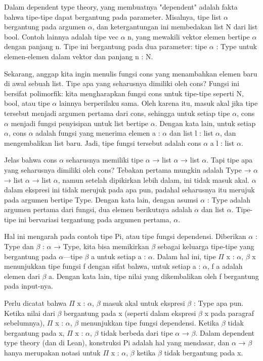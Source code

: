 Dalam dependent type theory, yang membuatnya "dependent" adalah fakta bahwa tipe-tipe dapat bergantung pada parameter. Misalnya, tipe list $\alpha$ bergantung pada argumen $\alpha$, dan ketergantungan ini membedakan list N dari list bool. Contoh lainnya adalah tipe vec $\alpha$ n, yang mewakili vektor elemen bertipe $\alpha$ dengan panjang n. Tipe ini bergantung pada dua parameter: tipe $\alpha$ : Type untuk elemen-elemen dalam vektor dan panjang n : N.

Sekarang, anggap kita ingin menulis fungsi cons yang menambahkan elemen baru di awal sebuah list. Tipe apa yang seharusnya dimiliki oleh cons? Fungsi ini bersifat polimorfik: kita mengharapkan fungsi cons untuk tipe-tipe seperti N, bool, atau tipe $\alpha$ lainnya berperilaku sama. Oleh karena itu, masuk akal jika tipe tersebut menjadi argumen pertama dari cons, sehingga untuk setiap tipe $\alpha$, cons $\alpha$ menjadi fungsi penyisipan untuk list bertipe $\alpha$. Dengan kata lain, untuk setiap $\alpha$, cons $\alpha$ adalah fungsi yang menerima elemen a : $\alpha$ dan list l : list $\alpha$, dan mengembalikan list baru. Jadi, tipe fungsi tersebut adalah cons $\alpha$ a l : list $\alpha$.

Jelas bahwa cons $\alpha$ seharusnya memiliki tipe $\alpha$ → list $\alpha$ → list $\alpha$. Tapi tipe apa yang seharusnya dimiliki oleh cons? Tebakan pertama mungkin adalah Type → $\alpha$ → list $\alpha$ → list $\alpha$, namun setelah dipikirkan lebih dalam, ini tidak masuk akal. $\alpha$ dalam ekspresi ini tidak merujuk pada apa pun, padahal seharusnya itu merujuk pada argumen bertipe Type. Dengan kata lain, dengan asumsi $\alpha$ : Type adalah argumen pertama dari fungsi, dua elemen berikutnya adalah $\alpha$ dan list $\alpha$. Tipe-tipe ini bervariasi tergantung pada argumen pertama, $\alpha$.

Hal ini mengarah pada contoh tipe Pi, atau tipe fungsi dependensi. Diberikan $\alpha$ : Type dan $\beta$ : $\alpha$ → Type, kita bisa memikirkan $\beta$ sebagai keluarga tipe-tipe yang bergantung pada $\alpha$—tipe $\beta$ a untuk setiap a : $\alpha$. Dalam hal ini, tipe $\Pi$ x : $\alpha$, $\beta$ x menunjukkan tipe fungsi f dengan sifat bahwa, untuk setiap a : $\alpha$, f a adalah elemen dari $\beta$ a. Dengan kata lain, tipe nilai yang dikembalikan oleh f bergantung pada input-nya.

Perlu dicatat bahwa $\Pi$ x : $\alpha$, $\beta$ masuk akal untuk ekspresi $\beta$ : Type apa pun. Ketika nilai dari $\beta$ bergantung pada x (seperti dalam ekspresi $\beta$ x pada paragraf sebelumnya), $\Pi$ x : $\alpha$, $\beta$ menunjukkan tipe fungsi dependensi. Ketika $\beta$ tidak bergantung pada x, $\Pi$ x : $\alpha$, $\beta$ tidak berbeda dari tipe $\alpha$ → $\beta$. Dalam dependent type theory (dan di Lean), konstruksi Pi adalah hal yang mendasar, dan $\alpha$ → $\beta$ hanya merupakan notasi untuk $\Pi$ x : $\alpha$, $\beta$ ketika $\beta$ tidak bergantung pada x.


